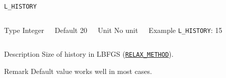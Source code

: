 \documentclass[xcolor=dvipsnames,t]{beamer}
\begin{document}
\begin{frame}[allowframebreaks]{\texttt{L\_HISTORY}} \label{L_HISTORY}
\vspace*{-12pt}
\begin{columns}
\begin{block}{Type}
Integer
\end{block}

\begin{block}{Default}
20
\end{block}

\begin{block}{Unit}
No unit
\end{block}

\begin{block}{Example}
\texttt{L\_HISTORY}: 15
\end{block}
\end{columns}

\begin{block}{Description}
Size of history in LBFGS (\hyperlink{RELAX_METHOD}{\texttt{RELAX\_METHOD}}).
\end{block}

\begin{block}{Remark}
Default value works well in most cases.
\end{block}

\end{frame}
\end{document}
